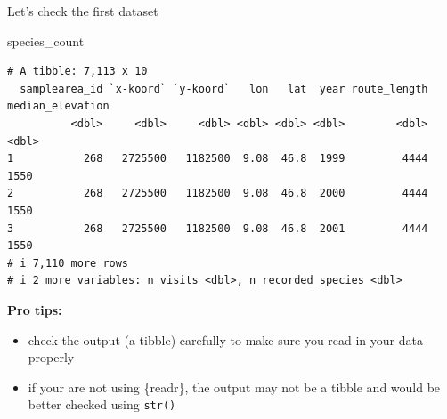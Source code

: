 \documentclass[
  ignorenonframetext,
  aspectratio=169,
]{beamer}
\newenvironment{Shaded}{\begin{snugshade}}{\end{snugshade}}
\newcommand{\NormalTok}[1]{\textcolor[rgb]{0.00,0.23,0.31}{#1}}
\providecommand{\tightlist}{%
  \setlength{\itemsep}{0pt}\setlength{\parskip}{0pt}}
\let\oldtexttt\texttt
\renewcommand{\texttt}[1]{\colorbox{gray!20}{\oldtexttt{#1}}}
\begin{document}
\begin{frame}[fragile]{Let's check the first dataset}
\protect{}\label{lets-check-the-first-dataset}
\footnotesize

\begin{Shaded}
\begin{Highlighting}[]
\NormalTok{species\_count}
\end{Highlighting}
\end{Shaded}

\begin{verbatim}
# A tibble: 7,113 x 10
  samplearea_id `x-koord` `y-koord`   lon   lat  year route_length median_elevation
          <dbl>     <dbl>     <dbl> <dbl> <dbl> <dbl>        <dbl>            <dbl>
1           268   2725500   1182500  9.08  46.8  1999         4444             1550
2           268   2725500   1182500  9.08  46.8  2000         4444             1550
3           268   2725500   1182500  9.08  46.8  2001         4444             1550
# i 7,110 more rows
# i 2 more variables: n_visits <dbl>, n_recorded_species <dbl>
\end{verbatim}

\normalsize

\pause

\textbf{Pro tips:}

\begin{itemize}
\tightlist
\item
  check the output (a tibble) carefully to make sure you read in your
  data properly
\item
  if your are not using \{readr\}, the output may not be a tibble and
  would be better checked using \texttt{str()}
\end{itemize}
\end{frame}
\end{document}
